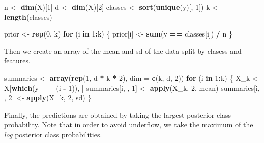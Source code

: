 \documentclass[]{article}
\newenvironment{Shaded}{\begin{snugshade}}{\end{snugshade}}
\newcommand{\KeywordTok}[1]{\textcolor[rgb]{0.13,0.29,0.53}{\textbf{#1}}}
\newcommand{\DataTypeTok}[1]{\textcolor[rgb]{0.13,0.29,0.53}{#1}}
\newcommand{\DecValTok}[1]{\textcolor[rgb]{0.00,0.00,0.81}{#1}}
\newcommand{\StringTok}[1]{\textcolor[rgb]{0.31,0.60,0.02}{#1}}
\newcommand{\ControlFlowTok}[1]{\textcolor[rgb]{0.13,0.29,0.53}{\textbf{#1}}}
\newcommand{\OperatorTok}[1]{\textcolor[rgb]{0.81,0.36,0.00}{\textbf{#1}}}
\newcommand{\NormalTok}[1]{#1}
\begin{document}
\begin{Shaded}
\begin{Highlighting}[]
\NormalTok{n <-}\StringTok{ }\KeywordTok{dim}\NormalTok{(X)[}\DecValTok{1}\NormalTok{]}
\NormalTok{d <-}\StringTok{ }\KeywordTok{dim}\NormalTok{(X)[}\DecValTok{2}\NormalTok{]}
\NormalTok{classes <-}\StringTok{ }\KeywordTok{sort}\NormalTok{(}\KeywordTok{unique}\NormalTok{(y)[, }\DecValTok{1}\NormalTok{])}
\NormalTok{k <-}\StringTok{ }\KeywordTok{length}\NormalTok{(classes)}

\NormalTok{prior <-}\StringTok{ }\KeywordTok{rep}\NormalTok{(}\DecValTok{0}\NormalTok{, k)}
\ControlFlowTok{for}\NormalTok{ (i }\ControlFlowTok{in} \DecValTok{1}\OperatorTok{:}\NormalTok{k) \{}
\NormalTok{  prior[i] <-}\StringTok{ }\KeywordTok{sum}\NormalTok{(y }\OperatorTok{==}\StringTok{ }\NormalTok{classes[i]) }\OperatorTok{/}\StringTok{ }\NormalTok{n}
\NormalTok{\}}
\end{Highlighting}
\end{Shaded}

Then we create an array of the mean and sd of the data split by clasess
and features.

\begin{Shaded}
\begin{Highlighting}[]
\NormalTok{summaries <-}\StringTok{ }\KeywordTok{array}\NormalTok{(}\KeywordTok{rep}\NormalTok{(}\DecValTok{1}\NormalTok{, d }\OperatorTok{*}\StringTok{ }\NormalTok{k }\OperatorTok{*}\StringTok{ }\DecValTok{2}\NormalTok{), }\DataTypeTok{dim =} \KeywordTok{c}\NormalTok{(k, d, }\DecValTok{2}\NormalTok{))}
\ControlFlowTok{for}\NormalTok{ (i }\ControlFlowTok{in} \DecValTok{1}\OperatorTok{:}\NormalTok{k) \{}
\NormalTok{  X_k <-}\StringTok{ }\NormalTok{X[}\KeywordTok{which}\NormalTok{(y }\OperatorTok{==}\StringTok{ }\NormalTok{(i }\OperatorTok{-}\StringTok{ }\DecValTok{1}\NormalTok{)), ]}
\NormalTok{  summaries[i, , }\DecValTok{1}\NormalTok{] <-}\StringTok{ }\KeywordTok{apply}\NormalTok{(X_k, }\DecValTok{2}\NormalTok{, mean)}
\NormalTok{  summaries[i, , }\DecValTok{2}\NormalTok{] <-}\StringTok{ }\KeywordTok{apply}\NormalTok{(X_k, }\DecValTok{2}\NormalTok{, sd)}
\NormalTok{\}}
\end{Highlighting}
\end{Shaded}

Finally, the predictions are obtained by taking the largest posterior
class probability. Note that in order to avoid underflow, we take the
maximum of the \emph{log} posterior class probabilities.
\end{document}
